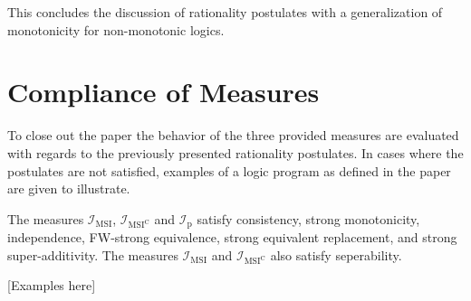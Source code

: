 This concludes the discussion of rationality postulates with a generalization of monotonicity for non-monotonic logics.

\section{Compliance of Measures}
To close out the paper the behavior of the three provided measures are evaluated with regards to the previously presented rationality postulates. In cases where the postulates are not satisfied, examples of a logic program as defined in the paper are given to illustrate.

\begin{proposition}
    The measures \(\mathcal{I}_{\text{MSI}}\), \(\mathcal{I}_{\text{MSI}^\text{C}}\) and \(\mathcal{I}_{\text{p}}\) satisfy consistency, strong monotonicity, independence, FW-strong equivalence, strong equivalent replacement, and strong super-additivity. The measures \(\mathcal{I}_{\text{MSI}}\) and \(\mathcal{I}_{\text{MSI}^\text{C}}\) also satisfy seperability.
\end{proposition}

[Examples here]

